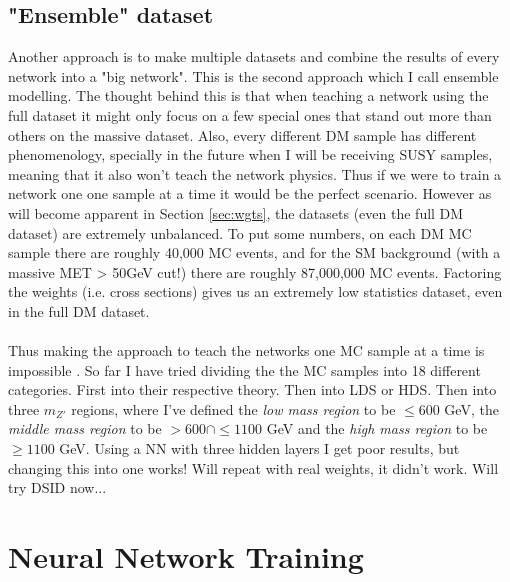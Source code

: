 \documentclass[14pt, a4paper]{book}
\begin{document}
\subsection{"Ensemble" dataset}
Another approach is to make multiple datasets and combine the results of every network into a "big network". This is the second approach which I call ensemble modelling. The thought behind this is that when teaching a network using the full dataset it might only focus on a few special ones that stand out more than others on the massive dataset. Also, every different DM sample has different phenomenology, specially in the future when I will be receiving SUSY samples, meaning that it also won't teach the network physics. Thus if we were to train a network one one sample at a time it would be the perfect scenario. However as will become apparent in Section \ref{sec:wgts}, the datasets (even the full DM dataset) are extremely unbalanced. To put some numbers, on each DM MC sample there are roughly 40,000 MC events, and for the SM background (with a massive MET > 50GeV cut!) there are roughly 87,000,000 MC events. Factoring the weights (i.e. cross sections) gives us an extremely low statistics dataset, even in the full DM dataset. \\
\\Thus making the approach to teach the networks one MC sample at a time is impossible . So far I have tried dividing the the MC samples into 18 different categories. First into their respective theory. Then into LDS or HDS. Then into three $m_{Z'}$ regions, where I've defined the \textit{low mass region} to be $\le 600$ GeV, the \textit{middle mass region} to be $>600 \cap\le 1100$ GeV and the\textit{ high mass region }to be $\ge 1100$ GeV. Using a NN with three hidden layers I get poor results, but changing this into one works! Will repeat with real weights, it didn't work. Will try DSID now...

\section{Neural Network Training}
\end{document}
